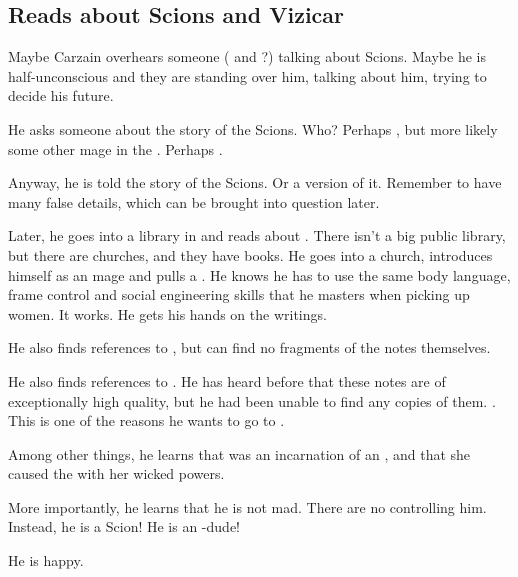\subsection{Reads about Scions and Vizicar}
Maybe Carzain overhears someone (\Esmerel{} and \Racel{}?) talking about Scions. 
Maybe he is half-unconscious and they are standing over him, talking about him, trying to decide his future. 

He asks someone about the story of the Scions. 
Who? 
Perhaps \Racel, but more likely some other mage in the \ishrah. 
Perhaps \Sanyor. 

Anyway, he is told the story of the Scions. Or a version of it. Remember to have many false details, which can be brought into question later. 

Later, he goes into a library in \Forklin{} and reads about \VizicarDurasRespina. 
There isn't a big public library, but there are churches, and they have books. 
He goes into a church, introduces himself as an \ishrah{} mage and pulls a .
He knows he has to use the same body language, frame control and social engineering skills that he masters when picking up women.
It works.
He gets his hands on the writings.

He also finds references to , but can find no fragments of the notes themselves. 

He also finds references to . 
He has heard before that these notes are of exceptionally high quality, but he had been unable to find any copies of them. 
. 
This is one of the reasons he wants to go to \Redce. 

Among other things, he learns that \Belzir{} was an incarnation of an  \malach, and that she caused the \HundredScourges{} with her wicked \malach{} powers. 

More importantly, he learns that he is not mad. 
There are no \qliphoth{} controlling him. 
Instead, he is a Scion! 
He is an \uber-dude! 

He is happy. 









